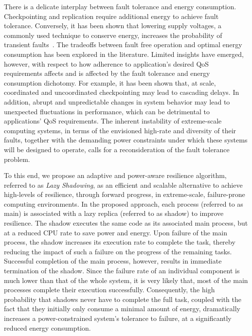 There is a delicate interplay between fault tolerance and energy consumption. Checkpointing and replication require additional energy to achieve fault tolerance. Conversely, it has been shown that lowering supply voltages, a commonly used technique to conserve energy, increases the probability of transient faults~\cite{chandra2008defect,zhu2004fail}. The tradeoffs between fault free operation and optimal energy consumption has been explored in the literature. Limited insights have emerged, however, with respect to how adherence to application's desired QoS requirements affects and is affected by the fault tolerance and energy consumption dichotomy. For example, it has been shown that, at scale, coordinated and uncoordinated checkpointing may lead to cascading delays. %
In addition, abrupt and unpredictable changes in system behavior may lead to unexpected fluctuations in performance, which can be detrimental to applications' QoS requirements. The inherent instability of extreme-scale computing systems, in terms of the envisioned high-rate and diversity of their faults, together with the demanding power constraints under which these systems will be designed to operate, calls for a reconsideration of the fault tolerance problem.

To this end, we propose an adaptive and power-aware resilience algorithm, referred to as \textit{Lazy
Shadowing}, as an efficient and scalable alternative to achieve high-levels of resilience, through
forward progress, in extreme-scale, failure-prone computing environments. In the proposed
approach, each process (referred to as main) is associated with a lazy replica (referred to as shadow) to improve resilience. The shadow executes the same code as its
associated main process, but at a reduced CPU rate to save power and energy. %
Upon failure of the main process, the shadow increases its 
execution rate to complete the task, thereby reducing the impact of such a failure on the progress of
the remaining tasks. Successful completion of the main process, however, results in immediate
termination of the shadow. Since the failure rate of an individual component is much lower than that of 
the whole system, it is very likely that, most of the main processes complete their execution
successfully. %
Consequently, the high probability that shadows never have to complete the full task, coupled with the fact that 
they initially only consume a minimal amount of energy, 
dramatically increases a power-constrained system's tolerance to failure, at a significantly reduced
energy consumption.

